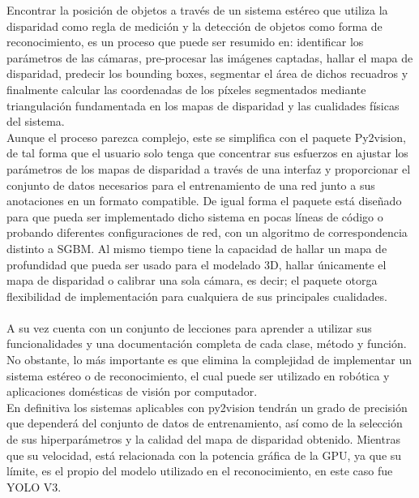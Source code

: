 Encontrar la posición de objetos a través de un sistema estéreo que utiliza la disparidad como regla de medición y la detección de objetos como forma de reconocimiento, es un proceso que puede ser resumido en: identificar los parámetros de las cámaras, pre-procesar las imágenes captadas, hallar el mapa de disparidad, predecir los bounding boxes, segmentar el área de dichos recuadros y finalmente calcular las coordenadas de los píxeles segmentados mediante triangulación fundamentada en los mapas de disparidad y las cualidades físicas del sistema.
\\
Aunque el proceso parezca complejo, este se simplifica con el paquete Py2vision, de tal forma que el usuario solo tenga que concentrar sus esfuerzos en ajustar los parámetros de los mapas de disparidad a través de una interfaz y proporcionar el conjunto de datos necesarios para el entrenamiento de una red junto a sus anotaciones en un formato compatible. De igual forma el paquete está diseñado para que pueda ser implementado dicho sistema en pocas líneas de código o probando diferentes configuraciones de red, con un algoritmo de correspondencia distinto a SGBM. Al mismo tiempo tiene la capacidad de hallar un mapa de profundidad que pueda ser usado para el modelado 3D, hallar únicamente el mapa de disparidad o calibrar una sola cámara, es decir; el paquete otorga flexibilidad de implementación para cualquiera de sus principales cualidades.
\\
\\
A su vez cuenta con un conjunto de lecciones para aprender a utilizar sus funcionalidades y una documentación completa de cada clase, método y función. No obstante, lo más importante es que elimina la complejidad de implementar un sistema estéreo o de reconocimiento, el cual puede ser utilizado en robótica y aplicaciones domésticas de visión por computador.
\\ 
En definitiva los sistemas aplicables con py2vision tendrán un grado de precisión que dependerá del conjunto de datos de entrenamiento, así como de la selección de sus hiperparámetros y la calidad del mapa de disparidad obtenido. Mientras que su velocidad, está relacionada con la potencia gráfica de la GPU, ya que su límite, es el propio del modelo utilizado en el reconocimiento, en este caso fue YOLO V3.